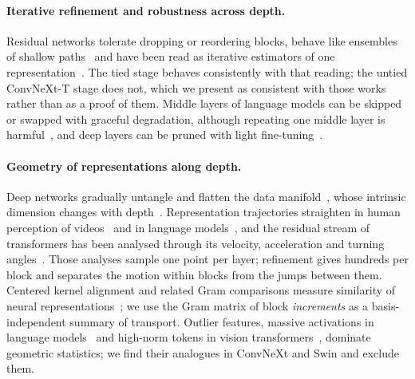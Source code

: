 \paragraph{Iterative refinement and robustness across depth.}
Residual networks tolerate dropping or reordering blocks, behave like ensembles of
shallow paths~\citep{veit2016residualnetworksbehavelike,huang2016stochastic} and have
been read as iterative estimators of one
representation~\citep{greff2017highway,jastrzebski2018iterative}.
The tied stage behaves consistently with that reading; the untied ConvNeXt-T stage
does not, which we present as consistent with those works rather than as a proof of
them.
Middle layers of language models can be skipped or swapped with graceful degradation,
although repeating one middle layer is harmful~\citep{sun2025painters,lad2025robustness},
and deep layers can be pruned with light fine-tuning~\citep{gromov2024unreasonable}.

\paragraph{Geometry of representations along depth.}
Deep networks gradually untangle and flatten the data
manifold~\citep{bengio2013representation,dicarlo2007untangling,brahma2016why,
hauser2017principles,naitzat2020topology,cohen2020separability}, whose intrinsic
dimension changes with depth~\citep{ansuini2019intrinsic,valeriani2023geometry}.
Representation trajectories straighten in human perception of
videos~\citep{henaff2019perceptual} and in language
models~\citep{hosseini2023straighten}, and the residual stream of transformers has been
analysed through its velocity, acceleration and turning
angles~\citep{fernando2025transformerdynamics,pandey2026trajectorygeometrytransformerrepresentations}.
Those analyses sample one point per layer; refinement gives hundreds per block and
separates the motion within blocks from the jumps between them.
Centered kernel alignment and related Gram comparisons measure similarity of neural
representations~\citep{kornblith2019similarity}; we use the Gram matrix of block
\emph{increments} as a basis-independent summary of transport.
Outlier features, massive activations in language
models~\citep{sun2024massiveactivationslargelanguage,pmlr-v306-sun26d} and high-norm
tokens in vision transformers~\citep{darcet2024vision}, dominate geometric statistics;
we find their analogues in ConvNeXt and Swin and exclude them.
